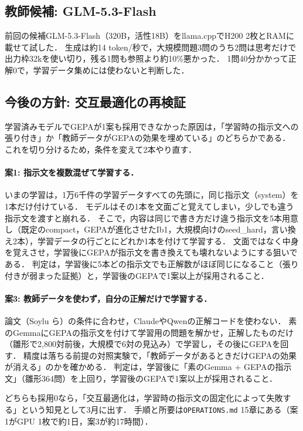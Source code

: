 \documentclass[12pt,a4paper]{article}
\begin{document}
\subsection{教師候補: GLM-5.3-Flash}

前回の候補GLM-5.3-Flash（320B，活性18B）をllama.cppでH200 2枚とRAMに載せて試した．
生成は約14 token/秒で，大規模問題3問のうち2問は思考だけで出力枠32kを使い切り，残る1問も参照より約10\%悪かった．
1問40分かかって正解0で，学習データ集めには使わないと判断した．


\subsection{今後の方針: 交互最適化の再検証}

学習済みモデルでGEPAが1案も採用できなかった原因は，「学習時の指示文への張り付き」か「教師データがGEPAの効果を埋めている」のどちらかである．
これを切り分けるため，条件を変えて2本やり直す．

\paragraph{案1: 指示文を複数混ぜて学習する．}
いまの学習は，1万6千件の学習データすべての先頭に，同じ指示文（system）を1本だけ付けている．
モデルはその1本を文面ごと覚えてしまい，少しでも違う指示文を渡すと崩れる．
そこで，内容は同じで書き方だけ違う指示文を5本用意し（既定のcompact，GEPAが進化させたIb1，大規模向けのseed\_hard，言い換え2本），学習データの行ごとにどれか1本を付けて学習する．
文面ではなく中身を覚えさせ，学習後にGEPAが指示文を書き換えても壊れないようにする狙いである．
判定は，学習後に5本どの指示文でも正解数がほぼ同じになること（張り付きが弱まった証拠）と，学習後のGEPAで1案以上が採用されること．

\paragraph{案3: 教師データを使わず，自分の正解だけで学習する．}
論文（Soylu ら）の条件に合わせ，ClaudeやQwenの正解コードを使わない．
素のGemmaにGEPAの指示文を付けて学習用の問題を解かせ，正解したものだけ（雛形で2,800対前後，大規模で6対の見込み）で学習し，その後にGEPAを回す．
精度は落ちる前提の対照実験で，「教師データがあるときだけGEPAの効果が消える」のかを確かめる．
判定は，学習後に「素のGemma + GEPAの指示文」（雛形364問）を上回り，学習後のGEPAで1案以上が採用されること．

どちらも採用0なら，「交互最適化は，学習時の指示文の固定化によって失敗する」という知見として3月に出す．
手順と所要は\texttt{OPERATIONS.md} 15章にある（案1がGPU 1枚で約1日，案3が約17時間）．
\end{document}
